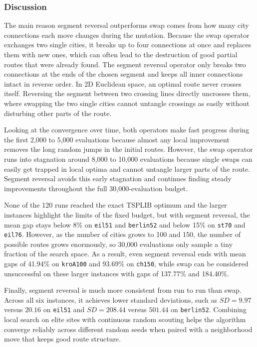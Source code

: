 \subsubsection{Discussion}
The main reason segment reversal outperforms swap comes from how many city connections each move changes during the mutation.
Because the swap operator exchanges two single cities, it breaks up to four connections at once and replaces them with new ones, which can often lead to the destruction of good partial routes that were already found.
The segment reversal operator only breaks two connections at the ends of the chosen segment and keeps all inner connections intact in reverse order.
In 2D Euclidean space, an optimal route never crosses itself.
Reversing the segment between two crossing lines directly uncrosses them, where swapping the two single cities cannot untangle crossings as easily without disturbing other parts of the route.

Looking at the convergence over time, both operators make fast progress during the first 2,000 to 5,000 evaluations because almost any local improvement removes the long random jumps in the initial routes.
However, the swap operator runs into stagnation around 8,000 to 10,000 evaluations because single swaps can easily get trapped in local optima and cannot untangle larger parts of the route.
Segment reversal avoids this early stagnation and continues finding steady improvements throughout the full 30,000-evaluation budget.

None of the 120 runs reached the exact TSPLIB optimum and the larger instances highlight the limits of the fixed budget, but with segment reversal, the mean gap stays below 8\% on \texttt{eil51} and \texttt{berlin52} and below 15\% on \texttt{st70} and \texttt{eil76}.
However, as the number of cities grows to 100 and 150, the number of possible routes grows enormously, so 30,000 evaluations only sample a tiny fraction of the search space.
As a result, even segment reversal ends with mean gaps of 41.94\% on \texttt{kroA100} and 93.69\% on \texttt{ch150}, while swap can be considered unsuccessful on these larger instances with gaps of 137.77\% and 184.40\%.

Finally, segment reversal is much more consistent from run to run than swap.
Across all six instances, it achieves lower standard deviations, such as \(SD = 9.97\) versus \(20.16\) on \texttt{eil51} and \(SD = 208.44\) versus \(501.44\) on \texttt{berlin52}.
Combining local search on elite sites with continuous random scouting helps the algorithm converge reliably across different random seeds when paired with a neighborhood move that keeps good route structure.
